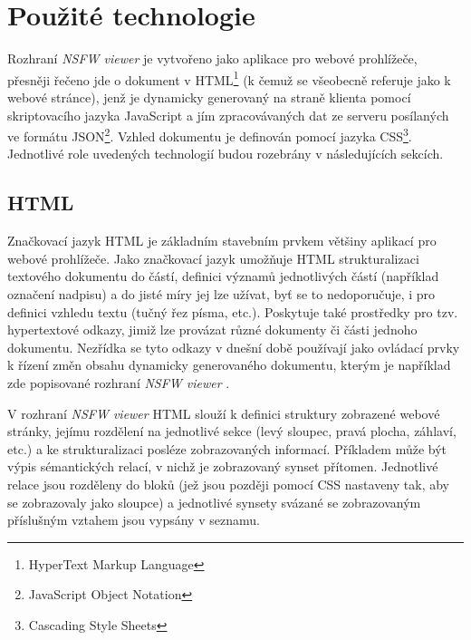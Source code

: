 \documentclass[a4paper, 11pt, oneside]{book}
\newcommand{\simplywn}{\textit{NSFW viewer} }
\begin{document}
		\chapter{Použité technologie}
		\label{cha:techno}

			Rozhraní \simplywn je vytvořeno jako aplikace pro webové prohlížeče, přesněji řečeno jde o dokument v HTML\footnote{HyperText Markup Language} (k čemuž se všeobecně referuje jako k webové stránce), jenž je dynamicky generovaný na straně klienta pomocí skriptovacího jazyka JavaScript a jím zpracovávaných dat ze serveru posílaných ve formátu JSON\footnote{JavaScript Object Notation}. Vzhled dokumentu je definován pomocí jazyka CSS\footnote{Cascading Style Sheets}. Jednotlivé role uvedených technologií budou rozebrány v následujících sekcích.

			\section{HTML}

				Značkovací jazyk HTML je základním stavebním prvkem většiny aplikací pro webové prohlížeče. Jako značkovací jazyk umožňuje HTML strukturalizaci textového dokumentu do částí, definici významů jednotlivých částí (například označení nadpisu) a do jisté míry jej lze užívat, byť se to nedoporučuje, i pro definici vzhledu textu (tučný řez písma, etc.). Poskytuje také prostředky pro tzv. hypertextové odkazy, jimiž lze provázat různé dokumenty či části jednoho dokumentu. Nezřídka se tyto odkazy v dnešní době používají jako ovládací prvky k řízení změn obsahu dynamicky generovaného dokumentu, kterým je například zde popisované rozhraní \simplywn. 

				V rozhraní \simplywn HTML slouží k definici struktury zobrazené webové stránky, jejímu rozdělení na jednotlivé sekce (levý sloupec, pravá plocha, záhlaví, etc.) a ke strukturalizaci posléze zobrazovaných informací. Příkladem může být výpis sémantických relací, v nichž je zobrazovaný synset přítomen. Jednotlivé relace jsou rozděleny do bloků (jež jsou později pomocí CSS nastaveny tak, aby se zobrazovaly jako sloupce) a jednotlivé synsety svázané se zobrazovaným příslušným vztahem jsou vypsány v seznamu. 
\end{document}

